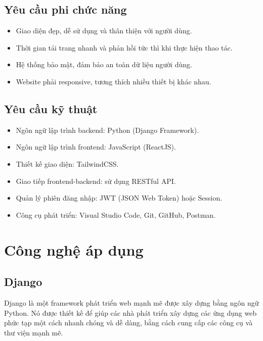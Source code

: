 \documentclass[a4paper]{article}
\begin{document}
\subsection{Yêu cầu phi chức năng}
\begin{itemize}
    \item Giao diện đẹp, dễ sử dụng và thân thiện với người dùng.
    \item Thời gian tải trang nhanh và phản hồi tức thì khi thực hiện thao tác.
    \item Hệ thống bảo mật, đảm bảo an toàn dữ liệu người dùng.
    \item Website phải responsive, tương thích nhiều thiết bị khác nhau.
\end{itemize}

\subsection{Yêu cầu kỹ thuật}
\begin{itemize}
    \item Ngôn ngữ lập trình backend: Python (Django Framework).
    \item Ngôn ngữ lập trình frontend: JavaScript (ReactJS).
    \item Thiết kế giao diện: TailwindCSS.
    \item Giao tiếp frontend-backend: sử dụng RESTful API.
    \item Quản lý phiên đăng nhập: JWT (JSON Web Token) hoặc Session.
    \item Công cụ phát triển: Visual Studio Code, Git, GitHub, Postman.
\end{itemize}

\newpage

\section{Công nghệ áp dụng}
\subsection{Django}
Django là một framework phát triển web mạnh mẽ được xây dựng bằng ngôn ngữ Python. Nó được thiết kế để giúp các nhà phát triển xây dựng các ứng dụng web phức tạp một cách nhanh chóng và dễ dàng, bằng cách cung cấp các công cụ và thư viện mạnh mẽ.\\
\end{document}
